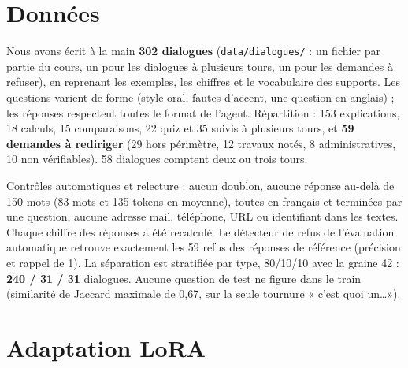 \documentclass[10pt,a4paper]{article}
\newcommand{\code}[1]{\texttt{\small #1}}
\begin{document}
\section{Données}

Nous avons écrit à la main \textbf{302 dialogues} (\code{data/dialogues/} : un fichier par partie du
cours, un pour les dialogues à plusieurs tours, un pour les demandes à refuser), en reprenant les exemples, les chiffres et le vocabulaire des supports. Les questions varient
de forme (style oral, fautes d'accent, une question en anglais) ; les réponses respectent toutes le
format de l'agent. Répartition : 153 explications, 18 calculs, 15 comparaisons, 22 quiz et 35 suivis
à plusieurs tours, et \textbf{59 demandes à rediriger} (29 hors périmètre, 12 travaux notés,
8 administratives, 10 non vérifiables). 58 dialogues comptent deux ou trois tours.

Contrôles automatiques et relecture : aucun doublon, aucune réponse au-delà de 150 mots (83 mots et
135 tokens en moyenne), toutes en français et terminées par une question, aucune adresse mail,
téléphone, URL ou identifiant dans les textes. Chaque chiffre des réponses a été recalculé. Le
détecteur de refus de l'évaluation automatique retrouve exactement les 59 refus des réponses de
référence (précision et rappel de 1). La séparation est stratifiée par type, 80/10/10 avec la
graine 42 : \textbf{240 / 31 / 31} dialogues. Aucune question de test ne figure dans le train
(similarité de Jaccard maximale de 0,67, sur la seule tournure « c'est quoi un\dots »).

\section{Adaptation LoRA}
\end{document}
